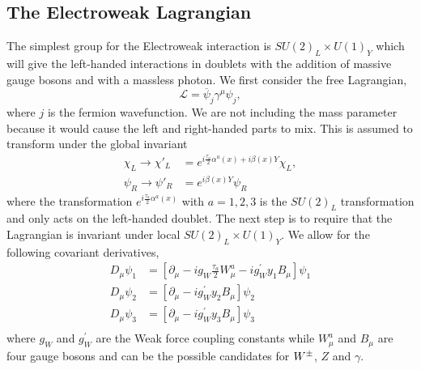 \subsection{The Electroweak Lagrangian}

The simplest group for the Electroweak interaction is $SU(2)_L\times U(1)_Y$ which will give the left-handed interactions in doublets with the addition of massive gauge bosons \W{} and \Z{} with a massless photon. We first consider the free Lagrangian,
\begin{equation}\label{WeakL}
\mathcal{L}=\overline{\psi}_j\gamma^\mu\psi_j,
\end{equation}
where $j$ is the fermion wavefunction. We are not including the mass parameter because it would cause the left and right-handed parts to mix.  This is assumed to transform under the global invariant
\begin{equation}\label{WeakGlobal}
\begin{split}
\chi_L\rightarrow\chi'_L&=e^{i\frac{\tau_a}{2}\alpha^a(x)+i\beta(x)Y}\chi_L, \\
\psi_R\rightarrow\psi'_R&=e^{i\beta(x)Y}\psi_R
\end{split}
\end{equation}
where the transformation $e^{i\frac{\tau_a}{2}\alpha^a(x)}$ with $a = 1, 2, 3$ is the $SU(2)_L$ transformation and only acts on the left-handed doublet. The next step is to require that the Lagrangian is invariant under local $SU(2)_L\times U(1)_Y$. We allow for the following covariant derivatives,
\begin{equation}
\begin{split}
D_\mu\psi_1&=[\partial_\mu-ig_W\frac{\tau_a}{2}W_\mu^a-ig_W^\prime y_1 B_\mu]\psi_1 \\
D_\mu\psi_2&=[\partial_\mu-ig_W^\prime y_2 B_\mu]\psi_2 \\
D_\mu\psi_3&=[\partial_\mu-ig_W^\prime y_3 B_\mu]\psi_3 \\
\end{split}
\end{equation}
where $g_W$ and $g_W^{\prime}$ are the Weak force coupling constants while $W_\mu^a$ and $B_\mu$ are four gauge bosons and can be the possible candidates for $W^\pm$, $Z$ and $\gamma$. 

